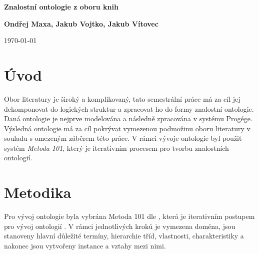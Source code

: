 \documentclass[a4paper,oneside,11pt,usenames,dvipsnames]{article}
\begin{document}
\thispagestyle{empty}
\begin {center}
	\vspace *{10mm}
	{\Huge \sffamily \bfseries Znalostní ontologie z oboru knih}

	\vspace *{20mm}
	{\Large \sffamily \bfseries Ondřej Maxa, Jakub Vojtko, Jakub Vítovec}

	\vspace *{7.5mm}
	{\large \sffamily \today}
\end {center}

\begin{abstract}
    Tato semestrální práce se zabývá analýzou, návrhem, implementací a kritickou analýzou znalostní ontologie zaměřené na obor literatury. Dle Metody 101 pro tvorbu ontologií byla vytvořena základní ontologie, zabírající 
    zmíněný obor. Hierarchie a vztahy této ontologie byly následně zachyceny v diagramu. Nakonec byl tento systém implementován v open-source frameworku Protége. Výsledkem je komplexní logická ontologie obsahující důležité třídy, vlastnosti, vztahy a charakteristiky z oboru literatury a knih a model, který zachycuje všechny tyto vlastnosti a navíc je schopen klasifikovat nové instance dle vnitřních logických vztahů. 
\end{abstract}

\setlength{\parskip}{1ex plus 0.25ex minus 0.125ex}
  
\section{Úvod}
\label{sec:uvod}
Obor literatury je široký a komplikovaný, tato semestrální práce má za cíl jej dekomponovat do logických struktur a zpracovat ho do formy znalostní ontologie. Daná ontologie je nejprve modelována a následně zpracována v systému Progége. Výsledná ontologie má za cíl pokrývat vymezenou podmožinu  oboru literatury v souladu s omezeným záběrem této práce. 
V rámci vývoje ontologie byl použit systém \textit{Metoda 101}, který je iterativním procesem pro tvorbu znalostních ontologií.

\section{Metodika}
Pro vývoj ontologie byla vybrána Metoda 101 dle \cite{noy2001ontology}
, která je iterativním postupem pro vývoj ontologií . V rámci jednotlivých kroků je vymezena doména, jsou stanoveny hlavní důležité termíny, hierarchie tříd, vlastnosti, charakteristiky a nakonec jsou vytvořeny instance a vztahy mezi nimi.
\end{document}
